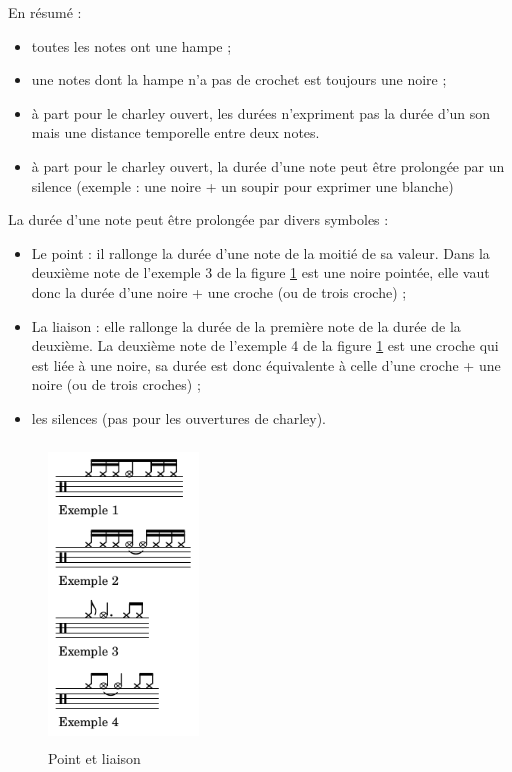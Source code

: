 En résumé :
\begin{itemize}
    \item toutes les notes ont une hampe ;
    \item une notes dont la hampe n’a pas de crochet est toujours une noire ;
    \item à part pour le charley ouvert, les durées n’expriment pas la durée
        d’un son mais une distance temporelle entre deux notes.
    \item à part pour le charley ouvert, la durée d’une note peut être
        prolongée par un silence (exemple : une noire + un soupir pour exprimer
        une blanche)\\
\end{itemize}
La durée d’une note peut être prolongée par divers symboles :
\begin{itemize}
	\item Le point : il rallonge la durée d’une note de la moitié de sa valeur.
        Dans la deuxième note de l’exemple 3 de la figure \ref{point_liaison}
        est une noire pointée, elle vaut donc la durée d’une noire + une croche
        (ou de trois croche) ;
	\item La liaison : elle rallonge la durée de la première note de la durée
        de la deuxième. La deuxième note de l’exemple 4 de la figure
        \ref{point_liaison} est une croche qui est liée à une noire, sa durée
        est donc équivalente à celle d’une croche + une noire (ou de trois
        croches) ;
    \item les silences (pas pour les ouvertures de charley).
\end{itemize}

\begin{figure}[h]
	\centering
	\includegraphics[height=80mm, width=40mm]{
    z_images/3_methodes/0_notation_de_la_batterie/3_point_et_liaison.png}
	\caption{Point et liaison}
	\label{point_liaison}
\end{figure}

